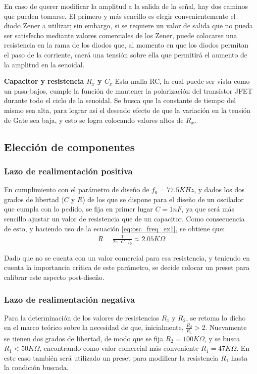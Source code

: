 En caso de querer modificar la amplitud a la salida de la señal, hay dos caminos que pueden tomarse.
El primero y más sencillo es elegir convenientemente el diodo Zener a utilizar; sin embargo, si se requiere un valor de salida que no pueda ser satisfecho 
mediante valores comerciales de los Zener, puede colocarse una resistencia en la rama de los diodos que, al momento en que los diodos permitan el paso de 
la corriente, caerá una tensión sobre ella que permitirá el aumento de la amplitud en la senoidal.
\newline

\textbf{Capacitor y resistencia $R_x$ y $C_x$} \label{sec:r_x_c_x_ex1}
Esta malla RC, la cual puede ser vista como un pasa-bajos, cumple la función de mantener la polarización del transistor JFET durante todo el ciclo de la 
senoidal.
Se busca que la constante de tiempo del mismo sea alta, para lograr así el deseado efecto de que la variación en la tensión de Gate sea baja, y esto se 
logra colocando valores altos de $R_x$.



\subsection{Elección de componentes}
\subsubsection{Lazo de realimentación positiva}
En cumplimiento con el parámetro de diseño de $f_0 = 77.5KHz$, y dados los dos grados de libertad ($C$ y $R$) de los que se dispone para el diseño de un 
oscilador que cumpla con lo pedido, se fija en primer lugar $C = 1nF$, ya que será más sencillo ajustar un valor de resistencia que de un capacitor.
Como consecuencia de esto, y haciendo uso de la ecuación \ref{eq:osc_freq_ex1}, se obtiene que:
\begin{align*}
    & R = \frac{1}{2\pi \cdot C \cdot f_0} \approx 2.05K\Omega
\end{align*}

Dado que no se cuenta con un valor comercial para esa resistencia, y teniendo en cuenta la importancia crítica de este parámetro, se decide colocar un 
preset para calibrar este aspecto post-diseño.


\subsubsection{Lazo de realimentación negativa}
Para la determinación de los valores de resistencias $R_1$ y $R_2$, se retoma lo dicho en el marco teórico sobre la necesidad de que, inicialmente, 
$\frac{R_2}{R_1} > 2$.
Nuevamente se tienen dos grados de libertad, de modo que se fija $R_2 = 100K\Omega$, y se busca $R_1 < 50K\Omega$, encontrando como valor comercial más 
conveniente $R_1 = 47K\Omega$.
En este caso también será utilizado un preset para modificar la resistencia $R_1$ hasta la condición buscada.

